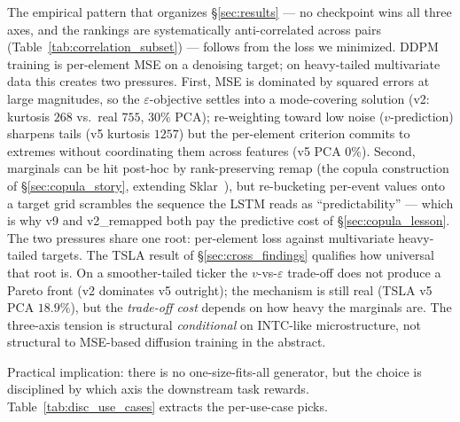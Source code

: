 \documentclass[journal]{IEEEtran}
\newcommand{\eps}{\varepsilon}
\theoremstyle{definition}   %
\begin{document}
The empirical pattern that organizes \S\ref{sec:results} --- no
checkpoint wins all three axes, and the rankings are systematically
anti-correlated across pairs
(Table~\ref{tab:correlation_subset}) --- follows from the loss we
minimized. DDPM training is per-element MSE on a denoising target;
on heavy-tailed multivariate data this creates two pressures.
First, MSE is dominated by squared errors at large magnitudes, so
the $\eps$-objective settles into a mode-covering solution (v2:
kurtosis $268$ vs.\ real $755$, $30\%$ PCA); re-weighting toward
low noise ($v$-prediction) sharpens tails (v5 kurtosis $1257$) but
the per-element criterion commits to extremes without coordinating
them across features (v5 PCA $0\%$). Second, marginals can be hit
post-hoc by rank-preserving remap (the copula construction of
\S\ref{sec:copula_story}, extending
Sklar~\cite{sklar1959fonctions}), but re-bucketing per-event
values onto a target grid scrambles the sequence the LSTM reads as
``predictability'' --- which is why v9 and v2\_remapped both pay
the predictive cost of \S\ref{sec:copula_lesson}. The two
pressures share one root: per-element loss against multivariate
heavy-tailed targets. The TSLA result of
\S\ref{sec:cross_findings} qualifies how universal that root is.
On a smoother-tailed ticker the $v$-vs-$\eps$ trade-off does not
produce a Pareto front (v2 dominates v5 outright); the mechanism is
still real (TSLA v5 PCA $18.9\%$), but the \emph{trade-off cost}
depends on how heavy the marginals are. The three-axis tension is
structural \emph{conditional} on INTC-like microstructure, not
structural to MSE-based diffusion training in the abstract.

Practical implication: there is no one-size-fits-all generator,
but the choice is disciplined by which axis the downstream task
rewards. Table~\ref{tab:disc_use_cases} extracts the per-use-case
picks.
\end{document}
